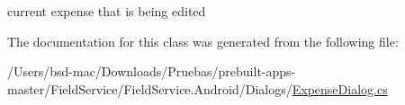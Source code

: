 current expense that is being edited 



The documentation for this class was generated from the following file\+:\begin{DoxyCompactItemize}
\item 
/\+Users/bsd-\/mac/\+Downloads/\+Pruebas/prebuilt-\/apps-\/master/\+Field\+Service/\+Field\+Service.\+Android/\+Dialogs/\hyperlink{_expense_dialog_8cs}{Expense\+Dialog.\+cs}\end{DoxyCompactItemize}
